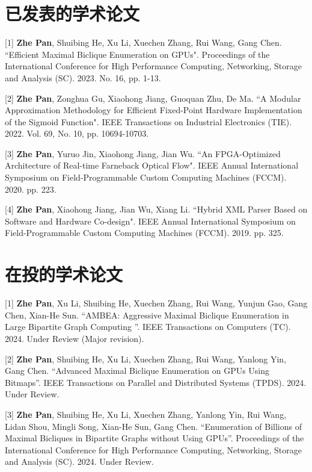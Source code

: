 \cleardoublepage
{}

\section*{已发表的学术论文}

[1] \textbf{Zhe Pan}, Shuibing He, Xu Li, Xuechen Zhang, Rui Wang, Gang Chen. ``Efficient Maximal Biclique Enumeration on GPUs". Proceedings of the International Conference for High Performance Computing, Networking, Storage and Analysis (SC). 2023. No. 16, pp. 1-13.

[2] \textbf{Zhe Pan}, Zonghua Gu, Xiaohong Jiang, Guoquan Zhu, De Ma. ``A Modular Approximation Methodology for Efficient Fixed-Point Hardware Implementation of the Sigmoid Function". IEEE Transactions on Industrial Electronics (TIE). 2022. Vol. 69, No. 10, pp. 10694-10703.

\begin{sloppypar}
[3] \textbf{Zhe Pan}, Yuruo Jin, Xiaohong Jiang, Jian Wu. ``An FPGA-Optimized Architecture of Real-time Farneback Optical Flow". IEEE Annual International Symposium on Field-Programmable Custom Computing Machines (FCCM). 2020. pp. 223.
\end{sloppypar}


[4] \textbf{Zhe Pan}, Xiaohong Jiang, Jian Wu, Xiang Li. ``Hybrid XML Parser Based on Software and Hardware
Co-design". IEEE Annual International Symposium on Field-Programmable Custom Computing Machines (FCCM). 2019. pp. 325.

\section*{在投的学术论文}

[1] \textbf{Zhe Pan}, Xu Li, Shuibing He, Xuechen Zhang, Rui Wang, Yunjun Gao, Gang Chen, Xian-He Sun. ``AMBEA: Aggressive Maximal Biclique Enumeration in Large Bipartite Graph Computing ''. IEEE Transactions on Computers (TC). 2024. Under Review (Major revision).

[2] \textbf{Zhe Pan}, Shuibing He, Xu Li, Xuechen Zhang, Rui Wang, Yanlong Yin, Gang Chen. ``Advanced Maximal Biclique Enumeration on GPUs Using Bitmaps''. IEEE Transactions on Parallel and Distributed Systems (TPDS). 2024. Under Review.

[3] \textbf{Zhe Pan}, Shuibing He, Xu Li, Xuechen Zhang, Yanlong Yin, Rui Wang, Lidan Shou, Mingli Song, Xian-He Sun, Gang Chen. ``Enumeration of Billions of Maximal Bicliques in Bipartite Graphs without Using GPUs''. Proceedings of the International Conference for High Performance Computing, Networking, Storage and Analysis (SC). 2024. Under Review.

